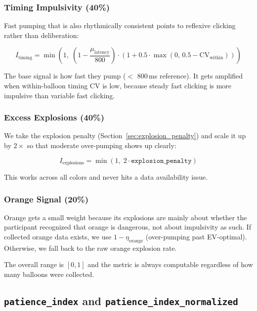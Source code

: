 \documentclass[11pt,a4paper]{article}
\begin{document}
\subsubsection*{Timing Impulsivity (40\%)}

Fast pumping that is also rhythmically consistent points to reflexive clicking
rather than deliberation:

\begin{equation}
    I_{\text{timing}} = \min\!\left(1,\;
        \left(1 - \frac{\mu_{\text{latency}}}{800}\right) \cdot
        \left(1 + 0.5 \cdot \max(0,\, 0.5 - \text{CV}_{\text{within}})\right)
    \right)
\end{equation}

The base signal is how fast they pump ($<$ 800\,ms reference). It gets
amplified when within-balloon timing CV is low, because steady fast clicking
is more impulsive than variable fast clicking.

\subsubsection*{Excess Explosions (40\%)}

We take the explosion penalty (Section~\ref{sec:explosion_penalty}) and
scale it up by $2\times$ so that moderate over-pumping shows up clearly:

\begin{equation}
    I_{\text{explosions}} = \min(1,\; 2 \cdot \texttt{explosion\_penalty})
\end{equation}

This works across all colors and never hits a data availability issue.

\subsubsection*{Orange Signal (20\%)}

Orange gets a small weight because its explosions are mainly about
whether the participant recognized that orange is dangerous, not about
impulsivity as such. If collected orange data exists, we use
$1 - \eta_{\text{orange}}$ (over-pumping past EV-optimal). Otherwise, we
fall back to the raw orange explosion rate.

The overall range is $[0, 1]$ and the metric is always computable
regardless of how many balloons were collected.


\subsection{\texttt{patience\_index} and \texttt{patience\_index\_normalized}}
\end{document}

